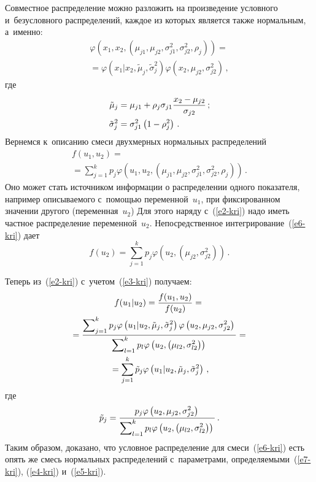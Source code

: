 \begin{multicols}{2}
Совместное распределение можно разложить на произведение
условного и~безусловного распределений, каждое из которых является также
нормальным, а~именно:
\begin{multline}
\varphi\left( x_1,x_2, \left( \mu_{j1}, \mu_{j2}, \sigma_{j1}^2,
\sigma_{j2}^2,\rho_j\right)\right)={}\\
{}= \varphi \left( x_1\vert x_2, \tilde{\mu}_j,
\tilde{\sigma}_j^2\right) \varphi\left( x_2, \mu_{j2},\sigma_{j2}^2\right)\,,
\label{e3-kri}
\end{multline}
где
\begin{align}
\tilde{\mu}_j &= \mu_{j1} +\rho_j \sigma_{j1} \displaystyle\frac{\displaystyle x_2-
\mu_{j2}\mathstrut}{\displaystyle \sigma_{j2}\mathstrut}\,;\label{e4-kri}\\
\tilde{\sigma}_j^2 &= \sigma^2_{j1} \left( 1-\rho_j^2\right)\,.\label{e5-kri}
\end{align}
Вернемся к~описанию смеси двухмерных нормальных распределений
\begin{multline}
f(u_1,u_2)={}\\
{}=\sum\limits_{j=1}^k p_j \varphi\left( u_1, u_2, \left( \mu_{j1},
\mu_{j2}, \sigma_{j1}^2, \sigma_{j2}^2, \rho_j\right)\right)\,.
\label{e6-kri}
\end{multline}
Оно может стать источником информации о распределении одного показателя,
например описываемого с~помощью переменной~$u_1$, при фиксированном
значении другого (переменная~$u_2$) Для этого наряду с~(\ref{e2-kri}) надо
иметь частное распределение переменной~$u_2$. Непосредственное
интегрирование~(\ref{e6-kri}) дает
$$
f(u_2) = \sum\limits_{j=1}^k p_j \varphi\left( u_2,\left( \mu_{j2},
\sigma_{j2}^2\right) \right)\,.
$$

     Теперь из~(\ref{e2-kri}) с~учетом~(\ref{e3-kri}) получаем:
     \begin{multline*}
     f(u_1\vert u_2) = \displaystyle\frac{\displaystyle f(u_1,u_2)\mathstrut}{\displaystyle f(u_2)\mathstrut}=  {}\\
     {}=\displaystyle\frac{\displaystyle \sum\nolimits_{j=1}^k p_j \varphi
\left(u_1\vert u_2, \tilde{\mu}_j, \tilde{\sigma}_j^2\right) \varphi \left(u_2,
\mu_{j2},\sigma_{j2}^2\right)\mathstrut}{\displaystyle \sum\nolimits_{l=1}^k p_l \varphi\left( u_2, \left(\mu_{l2},
\sigma_{l2}^2\right)\right)\mathstrut}= {}\\
{}= \sum\limits_{j=1}^k \tilde{p}_j \varphi\left( u_1\vert
u_2, \tilde{\mu}_j, \tilde{\sigma}_j^2\right)\,,
     \end{multline*}
где
\begin{equation}
\tilde{p}_j= \displaystyle\frac{\displaystyle p_j \varphi \left(u_2,\mu_{j2}, \sigma_{j2}^2\right)\mathstrut}{\displaystyle \sum\nolimits_{l=1}^k p_l
\varphi \left( u_2, \left( \mu_{l2},\sigma^2_{l2}\right)\right)\mathstrut}\,.
\label{e7-kri}
\end{equation}
Таким образом, доказано, что условное распределение для смеси~(\ref{e6-kri})
есть опять же смесь нормальных распределений с~параметрами,
определяемыми~(\ref{e7-kri}), (\ref{e4-kri}) и~(\ref{e5-kri}).


\end{multicols}
